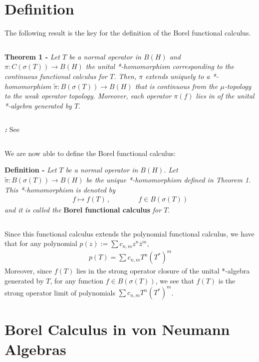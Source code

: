 \documentclass[12pt]{article}
\begin{document}
\section{Definition}

The following result is the key for the definition of the Borel functional calculus.

$\,$

{\bf Theorem 1 -} \emph{Let $T$ be a normal operator in $B(H)$ and $\pi:C(\sigma(T)) \longrightarrow B(H)$ the unital *-homomorphism corresponding to the continuous functional calculus for $T$. Then, $\pi$ extends uniquely to a *-homomorphism $\widetilde{\pi}: B(\sigma(T)) \longrightarrow B(H)$ that is continuous from the $\mu$-topology to the weak operator topology. Moreover, each operator $\pi(f)$ lies in   of the unital *-algebra generated by $T$.}

$\,$

{\bf \emph{:}} See 

$\,$

We are now able to define the Borel functional calculus:

{\bf Definition -} \emph{Let $T$ be a normal operator in $B(H)$. Let $\widetilde{\pi}: B(\sigma(T)) \longrightarrow B(H)$ be the unique *-homomorphism defined in Theorem 1. This *-homomorphism is denoted by}
\begin{align*}
f \longmapsto f(T)\,, \qquad\qquad f \in B(\sigma(T))
\end{align*}
\emph{and it is called the} {\bf Borel functional calculus} \emph{for $T$}.

$\,$

Since this functional calculus extends the polynomial functional calculus, we have that for any polynomial $p(z):= \sum c_{n,m} z^n \overline{z}^m$,
\begin{align*}
p(T)= \sum c_{n,m} T^n(T^*)^m
\end{align*}
Moreover, since $f(T)$ lies in the strong operator closure of the unital *-algebra generated by $T$, for any function $f \in B(\sigma(T))$, we see that $f(T)$ is the strong operator limit of polynomials $\sum c_{n,m} T^n(T^*)^m$.

\section{Borel Calculus in von Neumann Algebras}
\end{document}
